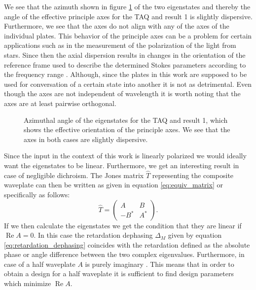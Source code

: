 We see that the azimuth shown in figure \ref{fig:cl4_eigenstate_azimuths} of the two eigenstates and thereby the angle of the effective principle axes for the TAQ and result 1 is slightly dispersive. Furthermore, we see that the axes do not align with any of the axes of the individual plates. This behavior of the principle axes can be a problem for certain applications such as in the measurement of the polarization of the light from stars. Since then the axial dispersion results in changes in the orientation of the reference frame used to describe the determined Stokes parameters according to the frequency range \cite{Clarke2004, Bailey2019}. Although, since the plates in this work are supposed to be used for conversation of a certain state into another it is not as detrimental. Even though the axes are not independent of wavelength it is worth noting that the axes are at least pairwise orthogonal.

\begin{figure}[H]
    \centering
    
    \caption{Azimuthal angle of the eigenstates for the TAQ and result 1, which shows the effective orientation of the principle axes. We see that the axes in both cases are slightly dispersive.}
    \label{fig:cl4_eigenstate_azimuths}
\end{figure}

Since the input in the context of this work is linearly polarized we would ideally want the eigenstates to be linear. Furthermore, we get an interesting result in case of negligible dichroism. The Jones matrix $\hat{T}$ representing the composite waveplate can then be written as given in equation \ref{eq:equiv_matrix} or specifically as follows:
\begin{equation}
    \hat{T} = 
    \begin{pmatrix} 
    A & B \\
    -B^* & A^*
    \end{pmatrix}.
\end{equation}
If we then calculate the eigenstates we get the condition that they are linear if $\operatorname{Re}A=0$. In this case the retardation dephasing $\Delta_M$ given by equation \ref{eq:retardation_dephasing} coincides with the retardation defined as the absolute phase or angle difference between the two complex eigenvalues. Furthermore, in case of a half waveplate $A$ is purely imaginary \cite{McIntyre1968}. This means that in order to obtain a design for a half waveplate it is sufficient to find design parameters which minimize $\operatorname{Re}A$.

